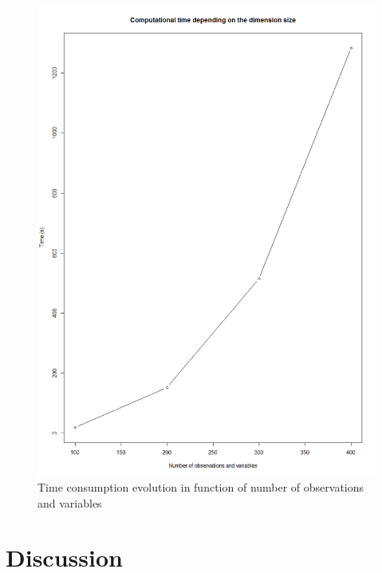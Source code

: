 \documentclass[twocolumn,12pt]{article}
\begin{document}
\begin{figure}[!]
    \centering
    \includegraphics[scale=0.3]{img/bothTime.png}
    \caption{Time consumption evolution in function of number of observations and variables}
    \label{fig:tpsBoth}
\end{figure}


\section{Discussion}
\end{document}
